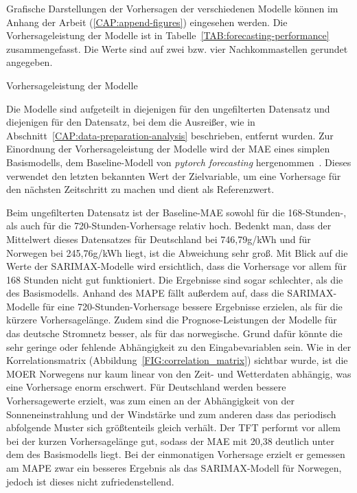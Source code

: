 Grafische Darstellungen der Vorhersagen der verschiedenen Modelle können im Anhang der Arbeit (\ref{CAP:append-figures}) eingesehen werden.
Die Vorhersageleistung der Modelle ist in Tabelle~\ref{TAB:forecasting-performance} zusammengefasst.
Die Werte sind auf zwei bzw. vier Nachkommastellen gerundet angegeben.
\begin{table}[htbp]
 \centering
 \caption{Vorhersageleistung der Modelle}
 \label{TAB:forecasting-performance}
 
\end{table}
Die Modelle sind aufgeteilt in diejenigen für den ungefilterten Datensatz und diejenigen für den Datensatz, bei dem die Ausreißer, wie in Abschnitt~\ref{CAP:data-preparation-analysis} beschrieben, entfernt wurden.
Zur Einordnung der Vorhersageleistung der Modelle wird der \ac{MAE} eines simplen Basismodells, dem Baseline-Modell von \textit{pytorch forecasting} hergenommen~\cite{PytorchForecastingDocumentation.20230410T20:05:46.000Zb}.
Dieses verwendet den letzten bekannten Wert der Zielvariable, um eine Vorhersage für den nächsten Zeitschritt zu machen und dient als Referenzwert.

Beim ungefilterten Datensatz ist der Baseline-\ac{MAE} sowohl für die 168-Stunden-, als auch für die 720-Stunden-Vorhersage relativ hoch.
Bedenkt man, dass der Mittelwert dieses Datensatzes für Deutschland bei 746,79g/kWh und für Norwegen bei 245,76g/kWh liegt, ist die Abweichung sehr groß.
Mit Blick auf die Werte der \ac{SARIMAX}-Modelle wird ersichtlich, dass die Vorhersage vor allem für 168 Stunden nicht gut funktioniert.
Die Ergebnisse sind sogar schlechter, als die des Basismodells.
Anhand des \ac{MAPE} fällt außerdem auf, dass die \ac{SARIMAX}-Modelle für eine 720-Stunden-Vorhersage bessere Ergebnisse erzielen, als für die kürzere Vorhersagelänge.
Zudem sind die Prognose-Leistungen der Modelle für das deutsche Stromnetz besser, als für das norwegische.
Grund dafür könnte die sehr geringe oder fehlende Abhängigkeit zu den Eingabevariablen sein.
Wie in der Korrelationsmatrix (Abbildung~\ref{FIG:correlation_matrix}) sichtbar wurde, ist die \ac{MOER} Norwegens nur kaum linear von den Zeit- und Wetterdaten abhängig, was eine Vorhersage enorm erschwert.
Für Deutschland werden bessere Vorhersagewerte erzielt, was zum einen an der Abhängigkeit von der Sonneneinstrahlung und der Windstärke und zum anderen dass das periodisch abfolgende Muster sich größtenteils gleich verhält.
Der \ac{TFT} performt vor allem bei der kurzen Vorhersagelänge gut, sodass der \ac{MAE} mit 20,38 deutlich unter dem des Basismodells liegt.
Bei der einmonatigen Vorhersage erzielt er gemessen am \ac{MAPE} zwar ein besseres Ergebnis als das \ac{SARIMAX}-Modell für Norwegen, jedoch ist dieses nicht zufriedenstellend.

